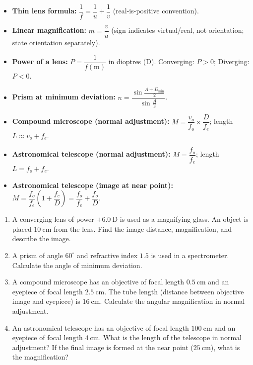 \documentclass[11pt]{article}
\begin{document}
\begin{aretenir}
\begin{itemize}
\item \textbf{Thin lens formula:} $\dfrac{1}{f} = \dfrac{1}{u} + \dfrac{1}{v}$ (real-is-positive convention).
\item \textbf{Linear magnification:} $m = \dfrac{v}{u}$ (sign indicates virtual/real, not orientation; state orientation separately).
\item \textbf{Power of a lens:} $P = \dfrac{1}{f(\mathrm{m})}$ in dioptres (D). Converging: $P>0$; Diverging: $P<0$.
\item \textbf{Prism at minimum deviation:} $n = \dfrac{\sin\frac{A+D_{\min}}{2}}{\sin\frac{A}{2}}$.
\item \textbf{Compound microscope (normal adjustment):} $M = \dfrac{v_o}{f_o} \times \dfrac{D}{f_e}$; length $L \approx v_o + f_e$.
\item \textbf{Astronomical telescope (normal adjustment):} $M = \dfrac{f_o}{f_e}$; length $L = f_o + f_e$.
\item \textbf{Astronomical telescope (image at near point):} $M = \dfrac{f_o}{f_e}\left(1 + \dfrac{f_e}{D}\right) = \dfrac{f_o}{f_e} + \dfrac{f_o}{D}$.
\end{itemize}
\end{aretenir}

\begin{exercice}
\begin{enumerate}
\item A converging lens of power $+6.0\ \mathrm{D}$ is used as a magnifying glass. An object is placed $10\ \mathrm{cm}$ from the lens. Find the image distance, magnification, and describe the image.
\item A prism of angle $60^\circ$ and refractive index $1.5$ is used in a spectrometer. Calculate the angle of minimum deviation.
\item A compound microscope has an objective of focal length $0.5\ \mathrm{cm}$ and an eyepiece of focal length $2.5\ \mathrm{cm}$. The tube length (distance between objective image and eyepiece) is $16\ \mathrm{cm}$. Calculate the angular magnification in normal adjustment.
\item An astronomical telescope has an objective of focal length $100\ \mathrm{cm}$ and an eyepiece of focal length $4\ \mathrm{cm}$. What is the length of the telescope in normal adjustment? If the final image is formed at the near point ($25\ \mathrm{cm}$), what is the magnification?
\end{enumerate}
\end{exercice}
\end{document}
